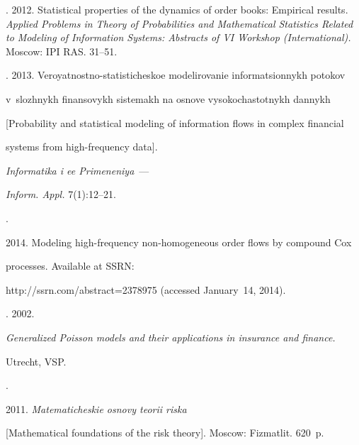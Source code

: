{. 2012. Statistical properties of the dynamics of order books: Empirical results. {\it Applied Problems in Theory of Probabilities and Mathematical Statistics Related to Modeling of Information Systems: Abstracts of VI  Workshop (International).} Moscow: IPI RAS. 31--51.







. 2013. Veroyatnostno-statisticheskoe modelirovanie informatsionnykh potokov 


v~slozhnykh finansovykh sistemakh na osnove vysokochastotnykh dannykh 


[Probability and statistical modeling of information flows in complex financial 


systems from high-frequency data]. 


{\it Informatika i ee Primeneniya}~---


\textit{Inform. Appl.} 7(1):12--21.







. 


2014. Modeling high-frequency non-homogeneous order flows by compound Cox 


processes. Available at SSRN: 


{\sf http://ssrn.com/abstract=2378975} (accessed January~14, 2014).







. 2002. 


{\it Generalized Poisson models and their applications in insurance and finance.} 


Utrecht, VSP.







. 


2011. {\it Matematicheskie osnovy teorii riska}


[Mathematical foundations of the risk theory]. Moscow: Fizmatlit. 620~p.





}
